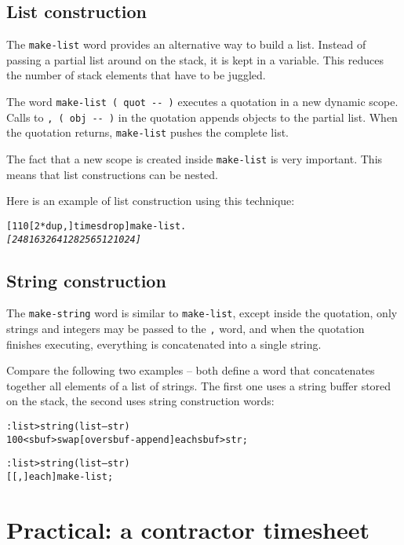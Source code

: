 \documentclass[english]{book}
\begin{document}
\section{\label{sub:List-constructors}List construction}

The \texttt{make-list} word provides an alternative way to build a list. Instead of passing a partial list around on the stack, it is kept in a variable. This reduces the number
of stack elements that have to be juggled.

The word \texttt{make-list ( quot -{}- )} executes a quotation in a new dynamic scope. Calls to \texttt{, ( obj -{}- )} in the quotation appends objects to the partial
list. When the quotation returns, \texttt{make-list} pushes the complete list.

The fact that a new
scope is created inside \texttt{make-list} is very important.
This means
that list constructions can be nested.

Here is an example of list construction using this technique:

\begin{alltt}
[ 1 10 {[} 2 {*} dup , {]} times drop ] make-list .
\emph{{[} 2 4 8 16 32 64 128 256 512 1024 {]}}
\end{alltt}

\section{String construction}

The \texttt{make-string} word is similar to \texttt{make-list}, except inside the quotation, only strings and integers may be passed to the \texttt{,} word, and when the quotation finishes executing, everything is concatenated into a single string.

Compare the following two examples -- both define a word that concatenates together all elements of a list of strings. The first one uses a string buffer stored on the stack, the second uses string construction words:

\begin{alltt}
: list>string ( list -- str )
    100 <sbuf> swap {[} over sbuf-append {]} each sbuf>str ;

: list>string ( list -- str )
    [ [ , ] each ] make-list ;
\end{alltt}

\chapter{Practical: a contractor timesheet}
\end{document}
